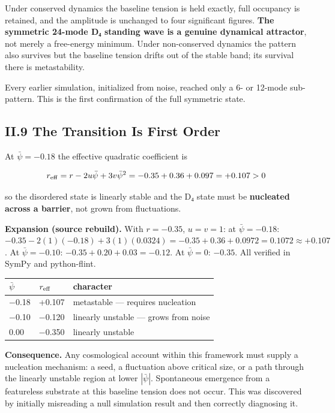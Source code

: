 \documentclass[a4paper,11pt]{article}
\newcommand{\expansion}[1]{\par\smallskip\noindent\textbf{Expansion (source rebuild).} #1\par\smallskip}
\begin{document}
Under conserved dynamics the baseline tension is held exactly, full occupancy is retained, and the amplitude is unchanged to four significant figures. \textbf{The symmetric 24-mode D₄ standing wave is a genuine dynamical attractor}, not merely a free-energy minimum. Under non-conserved dynamics the pattern also survives but the baseline tension drifts out of the stable band; its survival there is metastability.

Every earlier simulation, initialized from noise, reached only a 6- or 12-mode sub-pattern. This is the first confirmation of the full symmetric state.

\subsection*{II.9 The Transition Is First Order}

At $\bar\psi=-0.18$ the effective quadratic coefficient is

\[r_{\rm eff}=r-2u\bar\psi+3v\bar\psi^2=-0.35+0.36+0.097=+0.107>0\]

so the disordered state is linearly stable and the D₄ state must be \textbf{nucleated across a barrier}, not grown from fluctuations.


\expansion{With $r = -0.35$, $u = v = 1$: at $\bar{\psi} = -0.18$: $-0.35 - 2(1)(-0.18) + 3(1)(0.0324) = -0.35 + 0.36 + 0.0972 = 0.1072 \approx +0.107$. At $\bar{\psi} = -0.10$: $-0.35 + 0.20 + 0.03 = -0.12$. At $\bar{\psi} = 0$: $-0.35$. All verified in SymPy and python-flint.}
\begin{center}
\begin{tabular}{lll}
\hline
$\bar\psi$ & $r_{\rm eff}$ & character \\
\hline
$-$0.18 & +0.107 & metastable — requires nucleation \\
$-$0.10 & $-$0.120 & linearly unstable — grows from noise \\
0.00 & $-$0.350 & linearly unstable \\
\hline
\end{tabular}
\end{center}

\textbf{Consequence.} Any cosmological account within this framework must supply a nucleation mechanism: a seed, a fluctuation above critical size, or a path through the linearly unstable region at lower $|\bar\psi|$. Spontaneous emergence from a featureless substrate at this baseline tension does not occur. This was discovered by initially misreading a null simulation result and then correctly diagnosing it.
\end{document}
